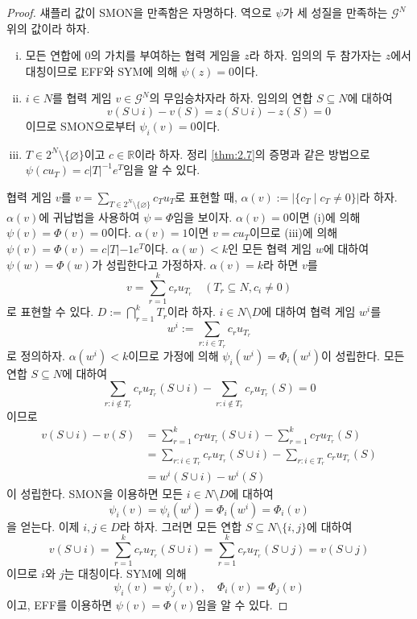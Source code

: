 \documentclass{article}
\numberwithin{equation}{section}
\begin{document}
\begin{proof}
	섀플리 값이 SMON을 만족함은 자명하다. 역으로 $\psi$가 세 성질을 만족하는 $\mathcal G^N$ 위의 값이라 하자.
	\begin{enumerate}[(i)]
		\item 모든 연합에 $0$의 가치를 부여하는 협력 게임을 $z$라 하자. 임의의 두 참가자는 $z$에서 대칭이므로 EFF와 SYM에 의해 $\psi(z)=0$이다.
		\item $i\in N$를 협력 게임 $v\in\mathcal G^N$의 무임승차자라 하자. 임의의 연합 $S\subseteq N$에 대하여
			\[
				v(S\cup i)-v(S)=z(S\cup i)-z(S)=0
			\]
			이므로 SMON으로부터 $\psi_i(v)=0$이다.
		\item $T\in 2^N\setminus\{\varnothing\}$이고 $c\in\mathbb R$이라 하자. 정리 \ref{thm:2.7}의 증명과 같은 방법으로 $\psi(cu_T)=c\vert T\vert^{-1}e^T$임을 알 수 있다.
	\end{enumerate}
	협력 게임 $v$를 $v=\sum_{T\in 2^N\setminus\{\varnothing\}}c_Tu_T$로 표현할 때, $\alpha(v):=\vert\{c_T\mid c_T\ne 0\}\vert$라 하자. $\alpha(v)$에 귀납법을 사용하여 $\psi=\Phi$임을 보이자. $\alpha(v)=0$이면 (i)에 의해 $\psi(v)=\Phi(v)=0$이다. $\alpha(v)=1$이면 $v=cu_T$이므로 (iii)에 의해 $\psi(v)=\Phi(v)=c\vert T\vert{-1}e^T$이다. $\alpha(w)<k$인 모든 협력 게임 $w$에 대하여 $\psi(w)=\Phi(w)$가 성립한다고 가정하자. $\alpha(v)=k$라 하면 $v$를
	\[
		v=\sum_{r=1}^kc_ru_{T_r}\quad(T_r\subseteq N, c_i\ne0)
	\]
	로 표현할 수 있다. $D:=\bigcap_{r=1}^kT_r$이라 하자. $i\in N\setminus D$에 대하여 협력 게임 $w^i$를
	\[
		w^i:=\sum_{r:i\in T_r}c_ru_{T_r}
	\]
	로 정의하자. $\alpha(w^i)<k$이므로 가정에 의해 $\psi_i(w^i)=\Phi_i(w^i)$이 성립한다. 모든 연합 $S\subseteq N$에 대하여
	\[
		\sum_{r:i\notin T_r}c_ru_{T_r}(S\cup i)-\sum_{r:i\notin T_r}c_ru_{T_r}(S)=0
	\]
	이므로
	\[
		\begin{aligned}
			v(S\cup i)-v(S)&=\sum_{r=1}^kc_Tu_{T_r}(S\cup i)-\sum_{r=1}^kc_Tu_{T_r}(S)\\
			&=\sum_{r:i\in T_r}c_ru_{T_r}(S\cup i)-\sum_{r:i\in T_r}c_ru_{T_r}(S)\\
			&=w^i(S\cup i)-w^i(S)
		\end{aligned}
	\]
	이 성립한다. SMON을 이용하면 모든 $i\in N\setminus D$에 대하여
	\[
		\psi_i(v)=\psi_i(w^i)=\Phi_i(w^i)=\Phi_i(v)
	\]
	을 얻는다. 이제 $i,j\in D$라 하자. 그러면 모든 연합 $S\subseteq N\setminus\{i,j\}$에 대하여
	\[
		v(S\cup i)=\sum_{r=1}^kc_ru_{T_r}(S\cup i)=\sum_{r=1}^kc_ru_{T_r}(S\cup j)=v(S\cup j)
	\]
	이므로 $i$와 $j$는 대칭이다. SYM에 의해
	\[
		\psi_i(v)=\psi_j(v),\quad\Phi_i(v)=\Phi_j(v)
	\]
	이고, EFF를 이용하면 $\psi(v)=\Phi(v)$임을 알 수 있다.
\end{proof}
\end{document}

